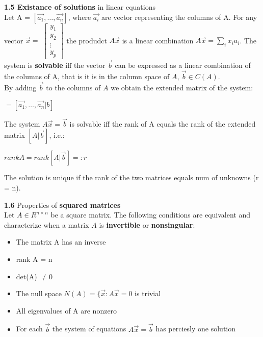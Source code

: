 \documentclass{article}
\begin{document}
\begin{multicols}{2}
	\textbf{1.5 Existance of solutions} in linear equations\\
	Let A = $[\vec{a_1}, \dots, \vec{a_n} ]$, where $\vec{a_i}$ are vector representing
	the columns of A.
	For any vector $\vec{x} =$ \begin{math}
		\begin{bmatrix}
			y_1    \\
			y_2    \\
			\vdots \\
			y_p
		\end{bmatrix}
	\end{math}
	the produdct $A\vec{x}$ is
	a linear combination $A\vec{x} = \sum_i x_i a_i$. The system is \textbf{solvable} iff the
	vector $\vec{b}$ can be expressed as a linear combination of the columns of A, that is
	it is in the column space of $A$, $\vec{b} \in C(A)$.\\
	By adding $\vec{b}$ to the columns of $A$ we obtain the extended matrix of the system:
	\begin{center}
		\begin{math}
			[A| \vec{b}] = [\vec{a_1}, \dots, \vec{a_n} | b]
		\end{math}
	\end{center}
	The system $A\vec{x} = \vec{b}$ is solvable iff the rank of A equals the rank of the
	extended matrix $[A| \vec{b}]$, i.e.:
	\begin{center}
		\begin{math}
			rank A = rank [A| \vec{b}] =: r
		\end{math}
	\end{center}
	The solution is unique if the rank of the two matrices equals num of unknowns (r = n).

	\textbf{1.6} Properties of \textbf{squared matrices}\\
	Let $A \in R^{n \times n}$ be a square matrix. The following conditions are equivalent
	and characterize when a matrix $A$ is \textbf{invertible} or \textbf{nonsingular}:
	\begin{itemize}
		\setlength\itemsep{0.1em}
		\item The matrix A has an inverse
		\item rank A = n
		\item det(A) $\neq 0$
		\item The null space $N(A) = \{\vec{x}: A\vec{x} = 0$ is trivial
		\item All eigenvalues of A are nonzero
		\item For each $\vec{b}$ the system of equations $A \vec{x} = \vec{b}$ has perciesly one solution
	\end{itemize}


\end{multicols}
\end{document}
